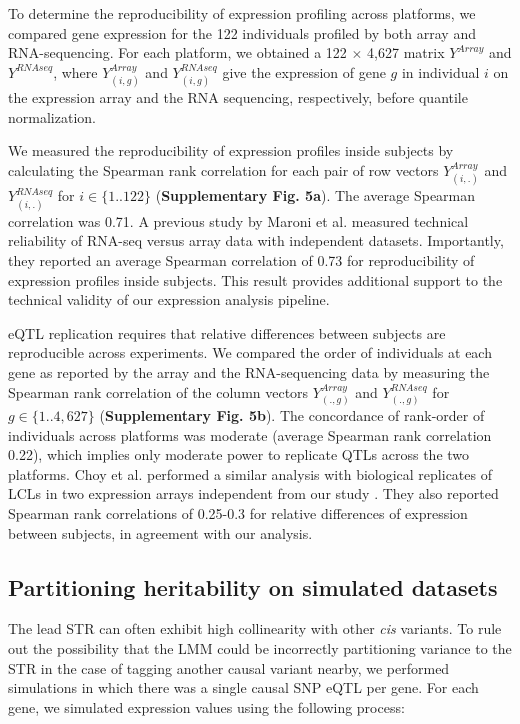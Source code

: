 To determine the reproducibility of expression profiling across
platforms, we compared gene expression for the 122 individuals profiled
by both array and RNA-sequencing. For each platform, we obtained a 122
$\times$ 4,627 matrix $Y^{Array}$ and $Y^{RNAseq}$, where
$Y_{(i,g)}^{Array}$ and $Y_{(i,g)}^{RNAseq}$ give the expression of gene
$g$ in individual $i$ on the expression array and the RNA sequencing,
respectively, before quantile normalization.

We measured the reproducibility of expression profiles inside subjects
by calculating the Spearman rank correlation for each pair of row
vectors $Y_{(i,.)}^{Array}$ and $Y_{(i,.)}^{RNAseq}$ for
$i\in\{1..122\}$ (\textbf{Supplementary Fig. 5a}). The average Spearman correlation was 0.71. A previous
study by Maroni et al. \cite{MarioniMasonManeEtAl2008} measured technical reliability of
RNA-seq versus array data with independent datasets. Importantly, they
reported an average Spearman correlation of 0.73 for reproducibility of
expression profiles inside subjects. This result provides additional
support to the technical validity of our expression analysis pipeline.

eQTL replication requires that relative differences between
subjects are reproducible across experiments. We compared the order of
individuals at each gene as reported by the array and the RNA-sequencing
data by measuring the Spearman rank correlation of the column vectors
$Y_{(.,g)}^{Array}$ and $Y_{(.,g)}^{RNAseq}$ for $g\in\{1..4,627\}$ (\textbf{Supplementary Fig. 5b}). The
concordance of rank-order of individuals across platforms was moderate
(average Spearman rank correlation 0.22), which implies only moderate
power to replicate QTLs across the two platforms. Choy et al. performed
a similar analysis with biological replicates of LCLs in two expression
arrays independent from our study \cite{ChoyYelenskyBonakdarEtAl2008}. They also reported
Spearman rank correlations of 0.25-0.3 for relative differences of
expression between subjects, in agreement with our analysis.



\subsection{Partitioning heritability on simulated datasets}

The lead STR can often exhibit high collinearity with other \emph{cis} variants. To rule out the possibility that the LMM could be incorrectly partitioning variance to the STR in the case of tagging another causal variant nearby, we performed simulations in which there was a single causal SNP eQTL per gene. For each gene, we simulated expression values using the following process:

